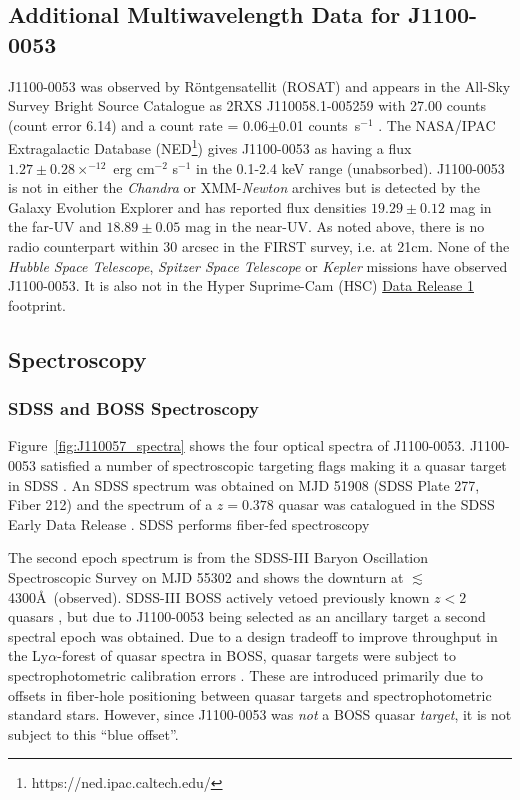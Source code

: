 \documentclass[a4paper,fleqn,usenatbib]{mnras}
\begin{document}
\subsection{Additional Multiwavelength Data for J1100-0053}
J1100-0053 was observed by R\"{o}ntgensatellit (ROSAT) and appears in
the All-Sky Survey Bright Source Catalogue \citep[RASS-BSC;
][]{Appenzeller1998, Voges1999} as 2RXS J110058.1-005259 with 27.00
counts (count error 6.14) and a count rate = 0.06$\pm$0.01
counts~s$^{-1}$ \citep{Boller2016}. The NASA/IPAC Extragalactic
Database (NED\footnote{https://ned.ipac.caltech.edu/}) gives
J1100-0053 as having a flux $1.27\pm0.28 \times^{-12}$ erg cm$^{-2}$
s$^{-1}$ in the 0.1-2.4 keV range (unabsorbed). J1100-0053 is not in
either the {\it Chandra} or XMM-{\it Newton} archives but is detected
by the Galaxy Evolution Explorer \citep[GALEX; ][]{Martin2005,
Morrissey2007} and has reported flux densities $19.29\pm0.12$ mag in
the far-UV and $18.89\pm0.05$ mag in the near-UV. As noted above,
there is no radio counterpart within 30 arcsec in the FIRST survey,
i.e. at 21cm. None of the {\it Hubble Space Telescope}, {\it Spitzer
Space Telescope} or {\it Kepler} missions have observed J1100-0053.
It is also not in the Hyper Suprime-Cam (HSC)
\href{https://hsc-release.mtk.nao.ac.jp/doc/}{Data Release 1}
\citep{Aihara2017} footprint.


\subsection{Spectroscopy}
\subsubsection{SDSS and BOSS Spectroscopy}

Figure~\ref{fig:J110057_spectra} shows the four optical spectra of
J1100-0053. J1100-0053 satisfied a number of spectroscopic targeting
flags making it a quasar target in SDSS \citep{Richards2002}. An SDSS
spectrum was obtained on MJD 51908 (SDSS Plate 277, Fiber 212) and the
spectrum of a $z=0.378$ quasar was catalogued in the SDSS Early Data
Release \citep{Stoughton2002, Schneider2002}. 
SDSS performs fiber-fed spectroscopy 

The second epoch spectrum is from the SDSS-III Baryon Oscillation
Spectroscopic Survey \citep[BOSS; ][]{Dawson2013} on MJD 55302 and
shows the downturn at $\lesssim$4300\AA\ (observed). SDSS-III BOSS
actively vetoed previously known $z<2$ quasars \citep{Ross2012}, but
due to J1100-0053 being selected as an ancillary target \citep[via a
white dwarf program;][]{Kepler2015, Kepler2016} a second spectral
epoch was obtained. Due to a design tradeoff to improve throughput in
the Ly$\alpha$-forest of quasar spectra in BOSS, quasar targets were
subject to spectrophotometric calibration errors
\citep{Margala2016}. These are introduced primarily due to offsets in
fiber-hole positioning between quasar targets and spectrophotometric
standard stars. However, since J1100-0053 was {\it not} a BOSS quasar
{\it target}, it is not subject to this ``blue offset''. 
\end{document}
